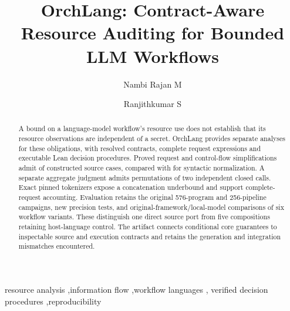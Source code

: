 \documentclass[preprint,12pt,a4paper]{elsarticle}
\begin{document}
\begin{frontmatter}
\title{OrchLang: Contract-Aware Resource Auditing for Bounded LLM Workflows}
\author[ci]{Nambi Rajan M}
\author[analytics]{Ranjithkumar S}
\address[ci]{Department of Computational Intelligence, SCOPE, Vellore Institute of Technology, India}
\address[analytics]{Department of Analytics, SCOPE, Vellore Institute of Technology, India}
\begin{abstract}
A bound on a language-model workflow's resource use does not establish that its
resource observations are independent of a secret. OrchLang provides separate
analyses for these obligations, with resolved contracts, complete request
expressions and executable Lean decision procedures. Proved request and
control-flow simplifications admit \revPrecisionSourceAccepted{} of
\revPrecisionSourceCases{} constructed source cases, compared with
\revPrecisionSourceBaseline{} for syntactic normalization. A separate aggregate
judgment admits permutations of two independent closed calls. Exact pinned
tokenizers expose a concatenation underbound and support complete-request
accounting. Evaluation retains the original 576-program and 256-pipeline
campaigns, new precision tests, and original-framework/local-model comparisons
of six workflow variants. These distinguish one direct source port from five
compositions retaining host-language control. The artifact connects conditional
core guarantees to inspectable source and execution contracts and retains the
generation and integration mismatches encountered.
\end{abstract}
\begin{keyword}
resource analysis \sep information flow \sep workflow languages \sep
verified decision procedures \sep reproducibility
\end{keyword}
\end{frontmatter}
\clearpage
\end{document}
